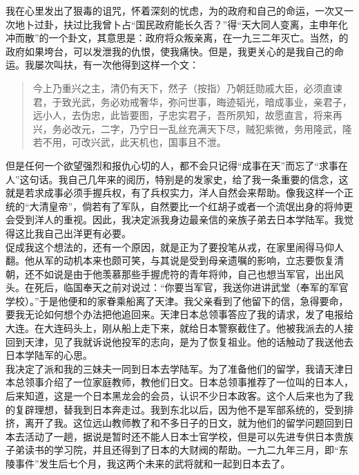 我在心里发出了狠毒的诅咒，怀着深刻的忧虑，为的政府和自己的命运，一次又一次地卜过卦，扶过比我曾卜占“国民政府能长久否？”得“天大同人变离，主申年化冲而散”的一个卦文，其意思是：政府将众叛亲离，在一九三二年灭亡。当然，的政府如果垮台，可以发泄我的仇恨，使我痛快。但是，我更关心的是我自己的命运。我屡次叫扶，有一次他得到这样一个文：\\

\begin{quote}
	今上乃重兴之主，清仍有天下，然子（按指）乃朝廷勋戚大臣，必须直谏君，于致光武，务必劝戒奢华，弥问世事，晦迹韬光，暗成事业，亲君子，远小人，去伪忠，此皆要图，子忠实君子，吾所夙知，故愿直言，将来再兴，务必改元，二字，乃宁日一乱丝充满天下尽，贼犯紫微，务用隆武，隆若不用，可改兴武，此天机也，国事且不泄。\\
\end{quote}

但是任何一个欲望强烈和报仇心切的人，都不会只记得“成事在天”而忘了“求事在人”这句话。我自己几年来的阅历，特别是的发家史，给了我一条重要的信念，这就是若求成事必须手握兵权，有了兵权实力，洋人自然会来帮助。像我这样一个正统的“大清皇帝”，倘若有了军队，自然要比一个红胡子或者一个流氓出身的将帅更会受到洋人的重视。因此，我决定派我身边最亲信的亲族子弟去日本学陆军。我觉得这比我自己出洋更有必要。\\

促成我这个想法的，还有一个原因，就是正为了要投笔从戎，在家里闹得马仰人翻。他从军的动机本来也颇可笑，与其说是受到母亲遗嘱的影响，立志要恢复清朝，还不如说是由于他羡慕那些手握虎符的青年将帅，自己也想当军官，出出风头。在死后，临国奉天之前对说过：“你要当军官，我送你进讲武堂（奉军的军官学校）。”于是他便和的家眷乘船离了天津。我父亲看到了他留下的信，急得要命，要我无论如何想个办法把他追回来。天津日本总领事答应了我的请求，发了电报给大连。在大连码头上，刚从船上走下来，就给日本警察截住了。他被我派去的人接回到天津，见了我就诉说他投军的志向，是为了恢复祖业。他的话触动了我送他去日本学陆军的心思。\\

我决定了派和我的三妹夫一同到日本去学陆军。为了准备他们的留学，我请天津日本总领事介绍了一位家庭教师，教他们日文。日本总领事推荐了一位叫的日本人，后来知道，这是一个日本黑龙会的会员，认识不少日本政客。这个人后来也为了我的复辟理想，替我到日本奔走过。我到东北以后，因为他不是军部系统的，受到排挤，离开了我。这位远山教师教了和不多日子的日文，就为他们的留学问题回到日本去活动了一趟，据说是暂时还不能人日本士官学校，但是可以先进专供日本贵族子弟读书的学习院，并且还得到了日本的大财阀的帮助。一九二九年三月，即“东陵事件”发生后七个月，我这两个未来的武将就和一起到日本去了。
